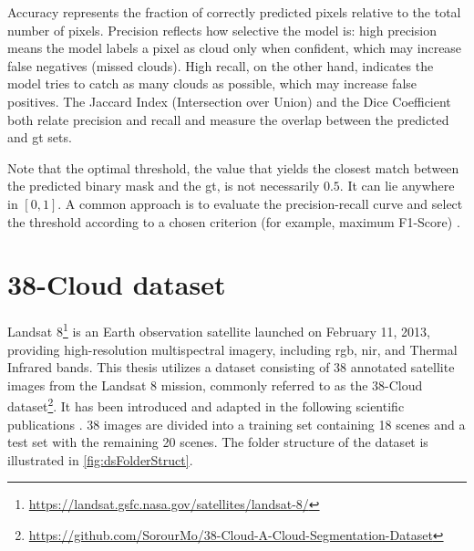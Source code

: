 {Accuracy represents the fraction of correctly predicted pixels relative to the total number of pixels.
Precision reflects how selective the model is: high precision means the model labels a pixel as cloud only when confident,
which may increase false negatives (missed clouds).
High recall, on the other hand, indicates the model tries to catch as many clouds as possible, which may increase false positives.
The Jaccard Index (Intersection over Union) \cite{jaccardindex} and the Dice Coefficient \cite{dicecoefficient}
both relate precision and recall and measure the overlap between the predicted and \gls{gt} sets.

Note that the optimal threshold, the value that yields the closest match between the predicted binary mask and the \gls{gt}, is not necessarily \(0.5\).
It can lie anywhere in \([0,1]\). A common approach is to evaluate the precision-recall curve and select the threshold according to a chosen criterion (for example, maximum F1-Score) \cite{prc, f1}.


\section{38-Cloud dataset}
\label{subsec:dataset}

Landsat 8\footnote{\url{https://landsat.gsfc.nasa.gov/satellites/landsat-8/}} is an Earth observation satellite launched on February 11, 2013,
providing high-resolution multispectral imagery, including \gls{rgb}, \gls{nir}, and Thermal Infrared bands.
This thesis utilizes a dataset consisting of 38 annotated satellite images from the Landsat 8 mission,
commonly referred to as the 38-Cloud dataset\footnote{\url{https://github.com/SorourMo/38-Cloud-A-Cloud-Segmentation-Dataset}}.
It has been introduced and adapted in the following scientific publications \cite{CloudDet2018, CloudNet2019}.
38 images are divided into a training set containing 18 scenes and a test set with the remaining 20 scenes.
The folder structure of the dataset is illustrated in \autoref{fig:dsFolderStruct}.

}

